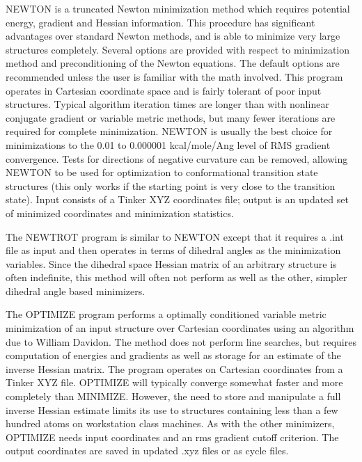 \documentclass[letterpaper,11pt,english]{sphinxmanual}
\begin{document}
NEWTON is a truncated Newton minimization method which requires potential energy, gradient and Hessian information. This procedure has significant advantages over standard Newton methods, and is able to minimize very large structures completely. Several options are provided with respect to minimization method and preconditioning of the Newton equations. The default options are recommended unless the user is familiar with the math involved. This program operates in Cartesian coordinate space and is fairly tolerant of poor input structures. Typical algorithm iteration times are longer than with nonlinear conjugate gradient or variable metric methods, but many fewer iterations are required for complete minimization. NEWTON is usually the best choice for minimizations to the 0.01 to 0.000001 kcal/mole/Ang level of RMS gradient convergence. Tests for directions of negative curvature can be removed, allowing NEWTON to be used for optimization to conformational transition state structures (this only works if the starting point is very close to the transition state). Input consists of a Tinker XYZ coordinates file; output is an updated set of minimized coordinates and minimization statistics.


The NEWTROT program is similar to NEWTON except that it requires a .int file as input and then operates in terms of dihedral angles as the minimization variables. Since the dihedral space Hessian matrix of an arbitrary structure is often indefinite, this method will often not perform as well as the other, simpler dihedral angle based minimizers.


The OPTIMIZE program performs a optimally conditioned variable metric minimization of an input structure over Cartesian coordinates using an algorithm due to William Davidon. The method does not perform line searches, but requires computation of energies and gradients as well as storage for an estimate of the inverse Hessian matrix. The program operates on Cartesian coordinates from a Tinker XYZ file. OPTIMIZE will typically converge somewhat faster and more completely than MINIMIZE. However, the need to store and manipulate a full inverse Hessian estimate limits its use to structures containing less than a few hundred atoms on workstation class machines. As with the other minimizers, OPTIMIZE needs input coordinates and an rms gradient cutoff criterion. The output coordinates are saved in updated .xyz files or as cycle files.
\end{document}
